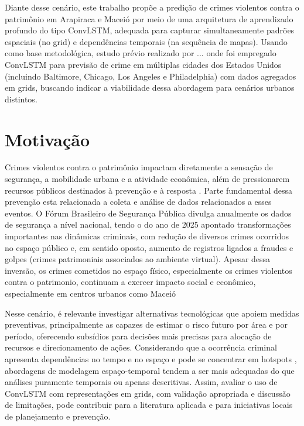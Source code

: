 Diante desse cenário, este trabalho propõe a predição de crimes violentos contra o patrimônio em Arapiraca e Maceió por meio de uma arquitetura de aprendizado profundo do tipo ConvLSTM, adequada para capturar simultaneamente padrões espaciais (no grid) e dependências temporais (na sequência de mapas). Usando como base metodológica, estudo prévio realizado por ... onde foi empregado ConvLSTM para previsão de crime em múltiplas cidades dos Estados Unidos (incluindo Baltimore, Chicago, Los Angeles e Philadelphia) com dados agregados em grids, buscando indicar a viabilidade dessa abordagem para cenários urbanos distintos.


\section{Motivação}
\label{Sec:Motivacao}
Crimes violentos contra o patrimônio impactam diretamente a sensação de segurança, a mobilidade urbana e a atividade econômica, além de pressionarem recursos públicos destinados à prevenção e à resposta  \cite{camacho22,fe2022bad}. Parte fundamental dessa prevenção esta relacionada a coleta e análise de dados relacionados a esses eventos. O Fórum Brasileiro de Segurança Pública divulga anualmente os dados de segurança a nível nacional, tendo o do ano de 2025 apontado transformações importantes nas dinâmicas criminais, com redução de diversos crimes ocorridos no espaço público e, em sentido oposto, aumento de registros ligados a fraudes e golpes (crimes patrimoniais associados ao ambiente virtual). Apesar dessa inversão, os crimes cometidos no espaço físico, especialmente os crimes violentos contra o patrimonio,  continuam a exercer impacto social e econômico, especialmente em centros urbanos como Maceió \cite{fe2022bad,fbsp2025} 

Nesse cenário, é relevante investigar alternativas tecnológicas que apoiem medidas preventivas, principalmente as capazes de estimar o risco futuro por área e por período, oferecendo subsídios para decisões mais precisas para alocação de recursos e direcionamento de ações. Considerando que a ocorrência criminal apresenta dependências no tempo e no espaço e pode se concentrar em hotspots \cite{Weisburd2022}, abordagens de modelagem espaço-temporal tendem a ser mais adequadas do que análises puramente temporais ou apenas descritivas. Assim, avaliar o uso de ConvLSTM com representações em grids, com validação apropriada e discussão de limitações, pode contribuir para a literatura aplicada e para iniciativas locais de planejamento e prevenção. 


